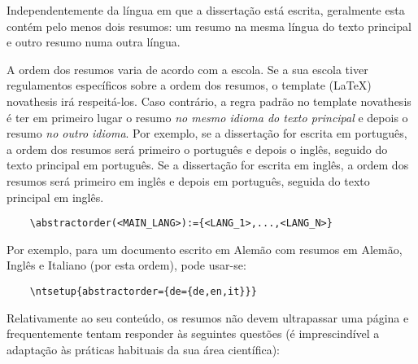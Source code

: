 
%

Independentemente da língua em que a dissertação está escrita, geralmente esta contém pelo menos dois resumos: um resumo na mesma língua do texto principal e outro resumo numa outra língua.

A ordem dos resumos varia de acordo com a escola. Se a sua escola tiver regulamentos específicos sobre a ordem dos resumos, o template (\LaTeX) \gls{novathesis} irá respeitá-los. Caso contrário, a regra padrão no template \gls{novathesis} é ter em primeiro lugar o resumo \emph{no mesmo idioma do texto principal} e depois o resumo \emph{no outro idioma}. Por exemplo, se a dissertação for escrita em português, a ordem dos resumos será primeiro o português e depois o inglês, seguido do texto principal em português. Se a dissertação for escrita em inglês, a ordem dos resumos será primeiro em inglês e depois em português, seguida do texto principal em inglês.
%

\begin{verbatim}
    \abstractorder(<MAIN_LANG>):={<LANG_1>,...,<LANG_N>}
\end{verbatim}

Por exemplo, para um documento escrito em Alemão com resumos em Alemão, Inglês e Italiano (por esta ordem), pode usar-se:
\begin{verbatim}
    \ntsetup{abstractorder={de={de,en,it}}}
\end{verbatim}

Relativamente ao seu conteúdo, os resumos não devem ultrapassar uma página e frequentemente tentam responder às seguintes questões (é imprescindível a adaptação às práticas habituais da sua área científica):


%
%

